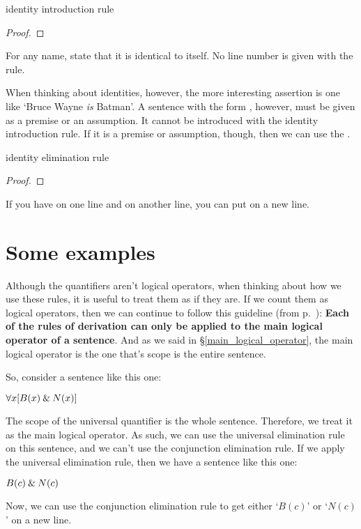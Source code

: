 \begin{factboxy}{identity introduction rule}
\begin{proof}
	 \ii{}
\end{proof}

\small{For any name, state that it is identical to itself. No line number is given with the rule.}
\end{factboxy}

When thinking about identities, however, the more interesting assertion is one like `Bruce Wayne \textit{is} Batman'. A sentence with the form , however, must be given as a premise or an assumption. It cannot be introduced with the identity introduction rule. If it is a premise or assumption, though, then we can use the .  

\begin{factboxy}{identity elimination rule}
\begin{proof}
	 
\end{proof}

\small{If you have  on one line and  on another line, you can put  on a new line.}
\end{factboxy}




\section{Some examples}

Although the quantifiers aren't logical operators, when thinking about how we use these rules, it is useful to treat them as if they are. If we count them as logical operators, then we can continue to follow this guideline (from p.~\pageref{rule-proofs-main-operator}): \textbf{Each of the rules of derivation can only be applied to the main logical operator of a sentence}. And as we said in \S \ref{main_logical_operator}, the main logical operator is the one that's scope is the entire sentence. 

So, consider a sentence like this one:

\begin{ebullet}
\item[] $\forall x[B(x) \mathbin{\&} N(x)]$
\end{ebullet}
The scope of the universal quantifier is the whole sentence. Therefore, we treat it as the main logical operator. As such, we can use the universal elimination rule on this sentence, and we can't use the conjunction elimination rule. If we apply the universal elimination rule, then we have a sentence like this one:
\begin{ebullet}
\item[] $B(c) \mathbin{\&} N(c)$
\end{ebullet}
Now, we can use the conjunction elimination rule to get either `$B(c)$' or `$N(c)$' on a new line. %

